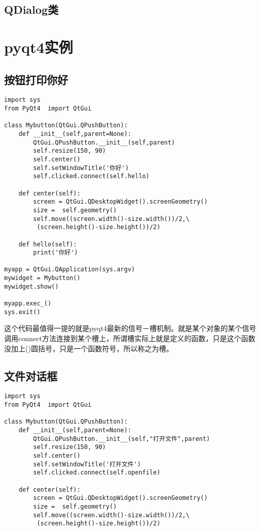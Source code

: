 \documentclass[12pt,oneside]{book}
\begin{document}
\begin{common-format}
\section{QDialog类}


\chapter{pyqt4实例}
\section{按钮打印你好}
\begin{Verbatim}
import sys
from PyQt4  import QtGui

class Mybutton(QtGui.QPushButton):
    def __init__(self,parent=None):
        QtGui.QPushButton.__init__(self,parent)
        self.resize(150, 90)
        self.center()
        self.setWindowTitle('你好')
        self.clicked.connect(self.hello)

    def center(self):
        screen = QtGui.QDesktopWidget().screenGeometry()
        size =  self.geometry()
        self.move((screen.width()-size.width())/2,\
         (screen.height()-size.height())/2)

    def hello(self):
        print('你好')

myapp = QtGui.QApplication(sys.argv)
mywidget = Mybutton()
mywidget.show()

myapp.exec_()
sys.exit()
\end{Verbatim}
这个代码最值得一提的就是pyqt4最新的信号－槽机制。就是某个对象的某个信号调用connect方法连接到某个槽上，所谓槽实际上就是定义的函数，只是这个函数没加上()圆括号，只是一个函数符号，所以称之为槽。


\section{文件对话框}
\begin{Verbatim}
import sys
from PyQt4  import QtGui

class Mybutton(QtGui.QPushButton):
    def __init__(self,parent=None):
        QtGui.QPushButton.__init__(self,"打开文件",parent)
        self.resize(150, 90)
        self.center()
        self.setWindowTitle('打开文件')
        self.clicked.connect(self.openfile)

    def center(self):
        screen = QtGui.QDesktopWidget().screenGeometry()
        size =  self.geometry()
        self.move((screen.width()-size.width())/2,\
         (screen.height()-size.height())/2)



\end{Verbatim}
\end{common-format}
\end{document}

